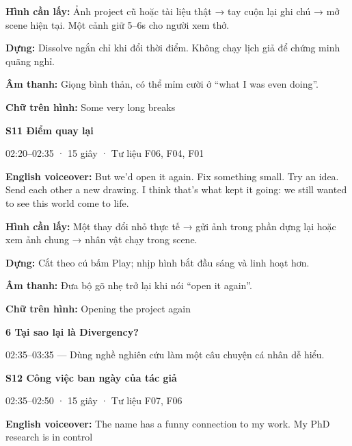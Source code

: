 \documentclass[10pt,a4paper]{article}
\begin{document}
\textbf{Hình cần lấy:}  Ảnh project cũ hoặc tài liệu thật → tay cuộn lại ghi chú → mở scene hiện tại. Một cảnh giữ 5–6s cho người xem thở.\par

\textbf{Dựng:}  Dissolve ngắn chỉ khi đổi thời điểm. Không chạy lịch giả để chứng minh quãng nghỉ.\par

\textbf{Âm thanh:}  Giọng bình thản, có thể mỉm cười ở “what I was even doing”.\par

\textbf{Chữ trên hình:}  Some very long breaks\par

\textbf{S11 Điểm quay lại}\par

02:20–02:35 · 15 giây · Tư liệu F06, F04, F01\par

\textbf{English voiceover:}  But we’d open it again. Fix something small. Try an idea. Send each other a new drawing. I think that’s what kept it going: we still wanted to see this world come to life.\par

\textbf{Hình cần lấy:}  Một thay đổi nhỏ thực tế → gửi ảnh trong phần dựng lại hoặc xem ảnh chung → nhân vật chạy trong scene.\par

\textbf{Dựng:}  Cắt theo cú bấm Play; nhịp hình bắt đầu sáng và linh hoạt hơn.\par

\textbf{Âm thanh:}  Đưa bộ gõ nhẹ trở lại khi nói “open it again”.\par

\textbf{Chữ trên hình:}  Opening the project again\par

\clearpage

\textbf{6 Tại sao lại là Divergency?}\par

02:35–03:35 — Dùng nghề nghiên cứu làm một câu chuyện cá nhân dễ hiểu.\par

\textbf{S12 Công việc ban ngày của tác giả}\par

02:35–02:50 · 15 giây · Tư liệu F07, F06\par

\textbf{English voiceover:}  The name has a funny connection to my work. My PhD research is in control\par
\end{document}
